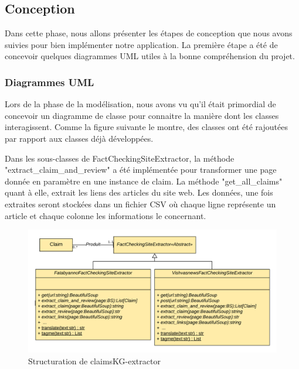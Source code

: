 \documentclass[oneside,13pt,a4paper]{report}
\begin{document}
\subsection{Conception}

Dans cette phase, nous allons présenter les étapes de conception que nous avons suivies pour bien implémenter notre application. La première étape a été de concevoir quelques diagrammes UML utiles à la bonne compréhension du projet.

\subsubsection*{Diagrammes UML}

Lors de la phase de la modélisation, nous avons vu qu'il était primordial de concevoir un diagramme de classe pour connaitre la manière dont les classes interagissent. Comme la figure suivante le montre, des classes ont été rajoutées par rapport aux classes déjà développées.

Dans les sous-classes de FactCheckingSiteExtractor, la méthode "extract\_claim\_and\_review" a été implémentée pour transformer une page donnée en paramètre en une instance de claim. La méthode  "get\_all\_claims" quant à elle, extrait les liens des articles du site web. Les données, une fois extraites seront stockées dans un fichier CSV où chaque ligne représente un article et chaque colonne les informations le concernant.

\begin{figure}[h]
	\centering
	\begin{minipage}[c]{.8\linewidth}
		\includegraphics[width=1\textwidth]{img/notre-extracteur.png}
		\caption{Structuration de claimsKG-extractor}
	\end{minipage}
\end{figure}
\end{document}
